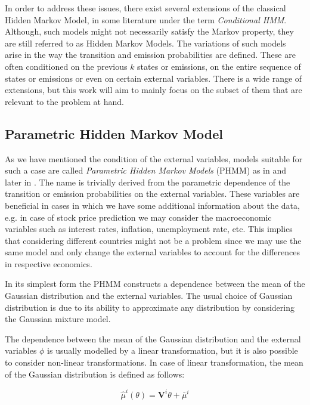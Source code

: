 In order to address these issues, there exist several extensions of the classical Hidden Markov Model, in some literature under the term \textit{Conditional HMM}. 
Although, such models might not necessarily satisfy the Markov property, they are still referred to as Hidden Markov Models. The variations of such models arise 
in the way the transition and emission probabilities are defined. These are often conditioned on the previous $k$ states or emissions, on the entire
sequence of states or emissions or even on certain external variables. There is a wide range of extensions, but this work will aim to mainly focus on the 
subset of them that are relevant to the problem at hand.

\subsection{Parametric Hidden Markov Model}

As we have mentioned the condition of the external variables, models suitable for such a case are called \textit{Parametric Hidden Markov Models} (PHMM) as in \citep{Bobick1999} and later in \citep{Radenen2014}.
The name is trivially derived from the parametric dependence of the transition or emission probabilities on the external variables. 
These variables are beneficial in cases in which we have some additional information about the data, e.g. in case of stock price prediction we may consider the
macroeconomic variables such as interest rates, inflation, unemployment rate, etc. This implies that considering different countries might not be a problem since we may
use the same model and only change the external variables to account for the differences in respective economics.

In its simplest form the PHMM constructs a dependence between the mean of the Gaussian distribution and the external variables. The usual choice of Gaussian distribution is 
due to its ability to approximate any distribution by considering the Gaussian mixture model. \citep{Bishop2006}

The dependence between the mean of the Gaussian distribution and the external variables $\phi$ is usually modelled by a linear transformation, but it is also possible to consider
non-linear transformations. In case of linear transformation, the mean of the Gaussian distribution is defined as follows:

\begin{equation} \label{eq: mu_hat}
    \hat{\mu}^{i}(\theta) = \textbf{V}^{i} \theta + \bar{\mu}^{i}
\end{equation}

